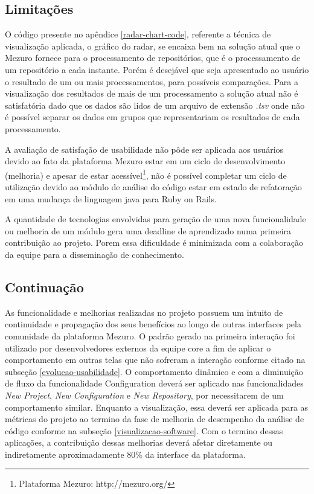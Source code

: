 \subsection{Limitações}
O código presente no apêndice \ref{radar-chart-code}, referente a técnica de visualização aplicada, o gráfico do radar, se encaixa bem na solução atual que o Mezuro fornece para o processamento de repositórios, que é o processamento de um repositório a cada instante. Porém é desejável que seja apresentado ao usuário o resultado de um ou mais processamentos, para possíveis comparações. Para a visualização dos resultados de mais de um processamento a solução atual não é satisfatória dado que os dados são lidos de um arquivo de extensão \textit{.tsv} onde não é possível separar os dados em grupos que representariam os resultados de cada processamento.

A avaliação de satisfação de usabilidade não pôde ser aplicada aos usuários devido ao fato da plataforma Mezuro estar em um ciclo de desenvolvimento (melhoria) e apesar de estar acessível\footnote{Plataforma Mezuro: http://mezuro.org/}, não é possível completar um ciclo de utilização devido ao módulo de análise do código estar em estado de refatoração em uma mudança de linguagem java para Ruby on Rails.

A quantidade de tecnologias envolvidas para geração de uma nova funcionalidade ou melhoria de um módulo gera uma deadline de aprendizado numa primeira contribuição ao projeto. Porem essa dificuldade é minimizada com a colaboração da equipe para a disseminação de conhecimento.

\subsection{Continuação}
As funcionalidade e melhorias realizadas no projeto possuem um intuito de continuidade e propagação dos seus benefícios ao longo de outras interfaces pela comunidade da plataforma Mezuro. O padrão gerado na primeira interação foi utilizado por desenvolvedores externos da equipe core a fim de aplicar o comportamento em outras telas que não sofreram a interação conforme citado na subseção \ref{evolucao-usabilidade}. O comportamento dinâmico e com a diminuição de fluxo da funcionalidade Configuration deverá ser aplicado nas funcionalidades \textit{New Project}, \textit{New Configuration} e \textit{New Repository}, por necessitarem de um comportamento similar. Enquanto a visualização, essa deverá ser aplicada para as métricas do projeto ao termino da fase de melhoria de desempenho da análise de código conforme na subseção \ref{visualizacao-software}. Com o termino dessas aplicações, a contribuição dessas melhorias deverá afetar diretamente ou indiretamente aproximadamente 80\% da interface da plataforma.

